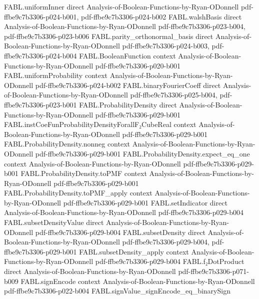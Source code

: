 \begin{theorem}
\proofstep
  {FABL.uniformInner}
  {direct}
  {Analysis-of-Boolean-Functions-by-Ryan-ODonnell}
  {pdf-ffbe9c7b3306-p024-b001,
    pdf-ffbe9c7b3306-p024-b002}
\proofstep
  {FABL.walshBasis}
  {direct}
  {Analysis-of-Boolean-Functions-by-Ryan-ODonnell}
  {pdf-ffbe9c7b3306-p023-b004,
    pdf-ffbe9c7b3306-p023-b006}
\proofstep
  {FABL.parity_orthonormal_basis}
  {direct}
  {Analysis-of-Boolean-Functions-by-Ryan-ODonnell}
  {pdf-ffbe9c7b3306-p024-b003,
    pdf-ffbe9c7b3306-p024-b004}
\proofstep
  {FABL.BooleanFunction}
  {context}
  {Analysis-of-Boolean-Functions-by-Ryan-ODonnell}
  {pdf-ffbe9c7b3306-p020-b001}
\proofstep
  {FABL.uniformProbability}
  {context}
  {Analysis-of-Boolean-Functions-by-Ryan-ODonnell}
  {pdf-ffbe9c7b3306-p024-b002}
\proofstep
  {FABL.binaryFourierCoeff}
  {direct}
  {Analysis-of-Boolean-Functions-by-Ryan-ODonnell}
  {pdf-ffbe9c7b3306-p025-b004,
    pdf-ffbe9c7b3306-p023-b001}
\proofstep
  {FABL.ProbabilityDensity}
  {direct}
  {Analysis-of-Boolean-Functions-by-Ryan-ODonnell}
  {pdf-ffbe9c7b3306-p029-b001}
\proofstep
  {FABL.instCoeFunProbabilityDensityForallF₂CubeReal}
  {context}
  {Analysis-of-Boolean-Functions-by-Ryan-ODonnell}
  {pdf-ffbe9c7b3306-p029-b001}
\proofstep
  {FABL.ProbabilityDensity.nonneg}
  {context}
  {Analysis-of-Boolean-Functions-by-Ryan-ODonnell}
  {pdf-ffbe9c7b3306-p029-b001}
\proofstep
  {FABL.ProbabilityDensity.expect_eq_one}
  {context}
  {Analysis-of-Boolean-Functions-by-Ryan-ODonnell}
  {pdf-ffbe9c7b3306-p029-b001}
\proofstep
  {FABL.ProbabilityDensity.toPMF}
  {context}
  {Analysis-of-Boolean-Functions-by-Ryan-ODonnell}
  {pdf-ffbe9c7b3306-p029-b001}
\proofstep
  {FABL.ProbabilityDensity.toPMF_apply}
  {context}
  {Analysis-of-Boolean-Functions-by-Ryan-ODonnell}
  {pdf-ffbe9c7b3306-p029-b001}
\proofstep
  {FABL.setIndicator}
  {direct}
  {Analysis-of-Boolean-Functions-by-Ryan-ODonnell}
  {pdf-ffbe9c7b3306-p029-b004}
\proofstep
  {FABL.subsetDensityValue}
  {direct}
  {Analysis-of-Boolean-Functions-by-Ryan-ODonnell}
  {pdf-ffbe9c7b3306-p029-b004}
\proofstep
  {FABL.subsetDensity}
  {direct}
  {Analysis-of-Boolean-Functions-by-Ryan-ODonnell}
  {pdf-ffbe9c7b3306-p029-b004,
    pdf-ffbe9c7b3306-p029-b001}
\proofstep
  {FABL.subsetDensity_apply}
  {context}
  {Analysis-of-Boolean-Functions-by-Ryan-ODonnell}
  {pdf-ffbe9c7b3306-p029-b004}
\proofstep
  {FABL.f₂DotProduct}
  {direct}
  {Analysis-of-Boolean-Functions-by-Ryan-ODonnell}
  {pdf-ffbe9c7b3306-p071-b009}
\proofstep
  {FABL.signEncode}
  {context}
  {Analysis-of-Boolean-Functions-by-Ryan-ODonnell}
  {pdf-ffbe9c7b3306-p022-b004}
\proofstep
  {FABL.signValue_signEncode_eq_binarySign}

\end{theorem}
